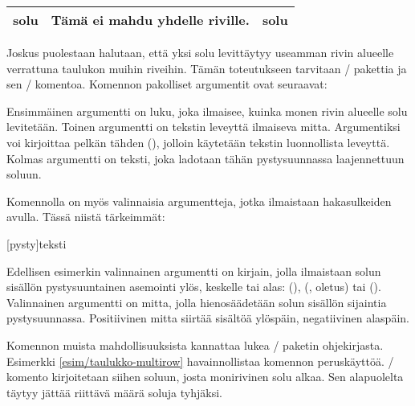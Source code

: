 \begin{tulossis}
  \renewcommand{\arraystretch}{1.2}
  \begin{tabular}{|l|p{6.5em}|l|}
    \hline solu & Tämä ei mahdu yhdelle riville. & solu \\ \hline
  \end{tabular}
\end{tulossis}

\noindent
Joskus puolestaan halutaan, että yksi solu levittäytyy useamman rivin
alueelle verrattuna taulukon muihin riveihin. Tämän toteutukseen
tarvitaan \-/ pakettia ja sen \-/
komentoa. Komennon pakolliset argumentit ovat seuraavat:

\begin{koodilohkosis}
\end{koodilohkosis}

\noindent
Ensimmäinen argumentti  on luku, joka ilmaisee, kuinka monen
rivin alueelle solu levitetään. Toinen argumentti  on
tekstin leveyttä ilmaiseva mitta. Argumentiksi voi kirjoittaa pelkän
tähden (\koodi{*}), jolloin käytetään tekstin luonnollista leveyttä.
Kolmas argumentti on teksti, joka ladotaan tähän pystysuunnassa
laajennettuun soluun.

Komennolla on myös valinnaisia argumentteja, jotka ilmaistaan
hakasulkeiden avulla. Tässä niistä tärkeimmät:

\begin{koodilohkosis}
[pysty]{teksti}
\end{koodilohkosis}

\noindent
Edellisen esimerkin valinnainen argumentti  on kirjain,
jolla ilmaistaan solun sisällön pystysuuntainen asemointi ylös, keskelle
tai alas:  (),  (,
oletus) tai  (). Valinnainen argumentti
 on mitta, jolla hienosäädetään solun sisällön sijaintia
pystysuunnassa. Positiivinen mitta siirtää sisältöä ylöspäin,
negatiivinen alaspäin.

Komennon muista mahdollisuuksista kannattaa lukea \-/
paketin ohjekirjasta. Esimerkki \ref{esim/taulukko-multirow}
havainnollistaa komennon peruskäyttöä. \-/ komento
kirjoitetaan siihen soluun, josta monirivinen solu alkaa. Sen
alapuolelta täytyy jättää riittävä määrä soluja tyhjäksi.

